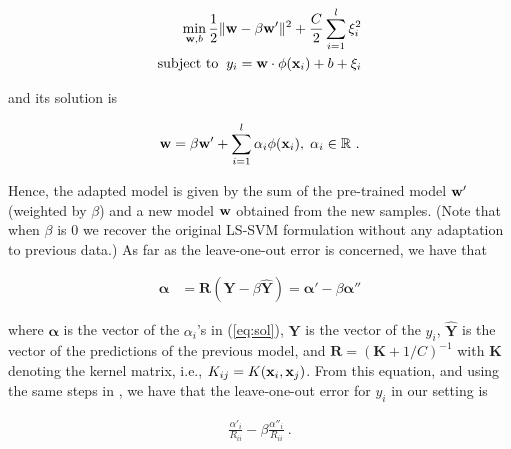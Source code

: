 \begin{align} 
  \min_{\mathbf{w},b} \frac{1}{2} \|\mathbf{w}- \beta \mathbf{w}'\|^2 + \frac{C}{2} \sum_{i=1}^l \xi_i^2 \nonumber \\
  \mbox{subject to} \;\; y_i = \mathbf{w} \cdot \phi(\mathbf{x}_i) + b + \xi_i
  \label{eq:opt_prob}
\end{align}

\noindent and its solution is

\begin{equation}
  \mathbf{w} = \beta \mathbf{w}' + \sum_{i=1}^l \alpha_i \phi(\mathbf{x}_i), \; \alpha_i \in \mathbb{R}~.
  \label{eq:sol}
\end{equation}

Hence, the adapted model is given by the sum of the pre-trained model
$\mathbf{w}'$ (weighted by $\beta$) and a new model $\mathbf{w}$ obtained from the new samples.
(Note that when $\beta$ is $0$ we recover the original LS-SVM
formulation without any adaptation to previous data.)
As far as the leave-one-out error is concerned,
we have that

\begin{align}
   \boldsymbol{\alpha}&=\boldsymbol{R} (\boldsymbol{Y}-\beta \hat{\boldsymbol{Y}}) =
     \boldsymbol{\alpha}' - \beta \boldsymbol{\alpha}''
\end{align}

\noindent where
$\boldsymbol{\alpha}$ is the vector of the $\alpha_i$'s in (\ref{eq:sol}),
$\boldsymbol{Y}$ is the vector of the $y_i$,
$\hat{\boldsymbol{Y}}$ is the vector of the predictions of the previous model, and
$\boldsymbol{R}=(\boldsymbol{K}+1/C)^{-1}$ with
$\boldsymbol{K}$ denoting the kernel matrix, i.e., $K_{ij}=K(\mathbf{x}_i,\mathbf{x}_j)$.
From this equation, and using the same steps in \cite{Cawley06}, we have that the
leave-one-out error for $y_i$ in our setting is

\begin{align}
	\frac{\alpha'_i}{R_{ii}} - \beta \frac{\alpha''_i}{R_{ii}}~.
\end{align}

